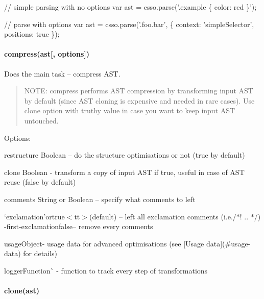 \begin{DoxyCode}
// simple parsing with no options
var ast = csso.parse('.example \{ color: red \}');

// parse with options
var ast = csso.parse('.foo.bar', \{
    context: 'simpleSelector',
    positions: true
\});
\end{DoxyCode}


\paragraph*{compress(ast\mbox{[}, options\mbox{]})}

Does the main task – compress A\+ST.

\begin{quote}
N\+O\+TE\+: {\ttfamily compress} performs A\+ST compression by transforming input A\+ST by default (since A\+ST cloning is expensive and needed in rare cases). Use {\ttfamily clone} option with truthy value in case you want to keep input A\+ST untouched. \end{quote}


Options\+:


\begin{DoxyItemize}
\item restructure {\ttfamily Boolean} – do the structure optimisations or not ({\ttfamily true} by default)
\item clone {\ttfamily Boolean} -\/ transform a copy of input A\+ST if {\ttfamily true}, useful in case of A\+ST reuse ({\ttfamily false} by default)
\item comments {\ttfamily String} or {\ttfamily Boolean} – specify what comments to left
\begin{DoxyItemize}
\item `\textquotesingle{}exclamation'{\ttfamily or}true$<$tt$>$(default) – left all exclamation comments (i.\+e./$\ast$! .. $\ast$/{\ttfamily ) -\/}\textquotesingle{}first-\/exclamationfalse{\ttfamily – remove every comments}
\end{DoxyItemize}
\item {\ttfamily usage}Object{\ttfamily -\/ usage data for advanced optimisations (see \mbox{[}Usage data\mbox{]}(\#usage-\/data) for details)}
\item {\ttfamily logger}Function\`{} -\/ function to track every step of transformations
\end{DoxyItemize}

\paragraph*{clone(ast)}

